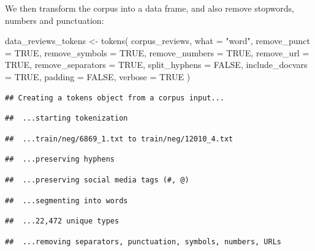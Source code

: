 \documentclass[
]{article}
\newenvironment{Shaded}{\begin{snugshade}}{\end{snugshade}}
\newcommand{\AttributeTok}[1]{\textcolor[rgb]{0.77,0.63,0.00}{#1}}
\newcommand{\ConstantTok}[1]{\textcolor[rgb]{0.00,0.00,0.00}{#1}}
\newcommand{\FunctionTok}[1]{\textcolor[rgb]{0.00,0.00,0.00}{#1}}
\newcommand{\NormalTok}[1]{#1}
\newcommand{\OtherTok}[1]{\textcolor[rgb]{0.56,0.35,0.01}{#1}}
\newcommand{\StringTok}[1]{\textcolor[rgb]{0.31,0.60,0.02}{#1}}
\begin{document}
We then transform the corpus into a data frame, and also remove stopwords, numbers and punctuation:

\begin{Shaded}
\begin{Highlighting}[]
\NormalTok{data\_reviews\_tokens }\OtherTok{\textless{}{-}} \FunctionTok{tokens}\NormalTok{(}
\NormalTok{ corpus\_reviews,}
 \AttributeTok{what =} \StringTok{"word"}\NormalTok{,}
 \AttributeTok{remove\_punct =} \ConstantTok{TRUE}\NormalTok{,}
 \AttributeTok{remove\_symbols =} \ConstantTok{TRUE}\NormalTok{,}
 \AttributeTok{remove\_numbers =} \ConstantTok{TRUE}\NormalTok{,}
 \AttributeTok{remove\_url =} \ConstantTok{TRUE}\NormalTok{,}
 \AttributeTok{remove\_separators =} \ConstantTok{TRUE}\NormalTok{,}
 \AttributeTok{split\_hyphens =} \ConstantTok{FALSE}\NormalTok{,}
 \AttributeTok{include\_docvars =} \ConstantTok{TRUE}\NormalTok{,}
 \AttributeTok{padding =} \ConstantTok{FALSE}\NormalTok{,}
 \AttributeTok{verbose =} \ConstantTok{TRUE}
\NormalTok{)}
\end{Highlighting}
\end{Shaded}

\begin{verbatim}
## Creating a tokens object from a corpus input...
\end{verbatim}

\begin{verbatim}
##  ...starting tokenization
\end{verbatim}

\begin{verbatim}
##  ...train/neg/6869_1.txt to train/neg/12010_4.txt
\end{verbatim}

\begin{verbatim}
##  ...preserving hyphens
\end{verbatim}

\begin{verbatim}
##  ...preserving social media tags (#, @)
\end{verbatim}

\begin{verbatim}
##  ...segmenting into words
\end{verbatim}

\begin{verbatim}
##  ...22,472 unique types
\end{verbatim}

\begin{verbatim}
##  ...removing separators, punctuation, symbols, numbers, URLs
\end{verbatim}
\end{document}
